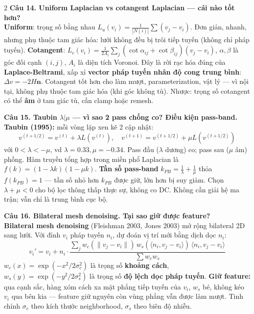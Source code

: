 \begin{paracol}{2}
\textbf{Câu 14. Uniform Laplacian vs cotangent Laplacian — cái nào tốt hơn?}\\
\textbf{Uniform}: trọng số bằng nhau $L_u(v_i)=\tfrac{1}{|N(i)|}\sum(v_j-v_i)$. Đơn giản, nhanh, nhưng phụ thuộc tam giác hóa: lưới không đều bị trôi tiếp tuyến (không chỉ pháp tuyến). \textbf{Cotangent}: $L_c(v_i)=\tfrac{1}{2A_i}\sum_j(\cot\alpha_{ij}+\cot\beta_{ij})(v_j-v_i)$, $\alpha,\beta$ là góc đối cạnh $(i,j)$, $A_i$ là diện tích Voronoi. Đây là rời rạc hóa đúng của \textbf{Laplace-Beltrami}, xấp xỉ \textbf{vector pháp tuyến nhân độ cong trung bình}: $\Delta v=-2H\mathbf{n}$. Cotangent tốt hơn cho làm mượt, parameterization, vật lý — vì nội tại, không phụ thuộc tam giác hóa (khi góc không tù). Nhược: trọng số cotangent có thể \textbf{âm} ở tam giác tù, cần clamp hoặc remesh.

\textbf{Câu 15. Taubin $\lambda|\mu$ — vì sao 2 pass chống co? Điều kiện pass-band.}\\
\textbf{Taubin (1995):} mỗi vòng lặp xen kẽ 2 cập nhật:
\[
v^{(t+1/2)}=v^{(t)}+\lambda L(v^{(t)}),\quad v^{(t+1)}=v^{(t+1/2)}+\mu L(v^{(t+1/2)})
\]
với $0<\lambda<-\mu$, vd $\lambda=0.33,\mu=-0.34$. Pass đầu ($\lambda$ dương) co; pass sau ($\mu$ âm) phồng. Hàm truyền tổng hợp trong miền phổ Laplacian là $f(k)=(1-\lambda k)(1-\mu k)$. \textbf{Tần số pass-band} $k_{PB}=\tfrac{1}{\lambda}+\tfrac{1}{\mu}$ thỏa $f(k_{PB})=1$ — tần số nhỏ hơn $k_{PB}$ được giữ, lớn hơn bị suy giảm. Chọn $\lambda+\mu<0$ cho bộ lọc thông thấp thực sự, không co DC. Không cần giải hệ ma trận; vẫn chỉ là trung bình cục bộ.

\textbf{Câu 16. Bilateral mesh denoising. Tại sao giữ được feature?}\\
\textbf{Bilateral mesh denoising} (Fleishman 2003, Jones 2003) mở rộng bilateral 2D sang lưới. Với đỉnh $v_i$ pháp tuyến $n_i$, dự đoán vị trí mới bằng dịch dọc $n_i$:
\[
v_i'=v_i+n_i\cdot\frac{\sum_j w_c(\|v_j-v_i\|)\,w_s(\langle n_i,v_j-v_i\rangle)\,\langle n_i,v_j-v_i\rangle}{\sum w_c w_s}
\]
$w_c(x)=\exp(-x^2/2\sigma_c^2)$ là trọng số \textbf{khoảng cách}, $w_s(y)=\exp(-y^2/2\sigma_s^2)$ là trọng số \textbf{độ lệch dọc pháp tuyến}. \textbf{Giữ feature:} qua cạnh sắc, hàng xóm cách xa mặt phẳng tiếp tuyến của $v_i$, $w_s$ bé, không kéo $v_i$ qua bên kia — feature giữ nguyên còn vùng phẳng vẫn được làm mượt. Tinh chỉnh $\sigma_c$ theo kích thước neighborhood, $\sigma_s$ theo biên độ nhiễu.

\switchcolumn*


\end{paracol}
